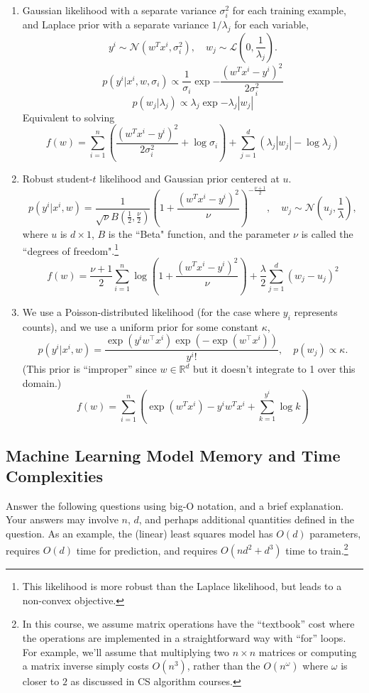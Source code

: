 \documentclass{article}
\def\blu#1{{\color{blu}#1}}
\def\R{\mathbb{R}}
\def\enum#1{\begin{enumerate}#1\end{enumerate}}
\begin{document}
\blu{\enum{
\item Gaussian likelihood with a separate variance $\sigma_i^2$ for each training example, and Laplace prior with a separate variance $1/\lambda_j$ for each variable,
\[
y^i \sim \mathcal{N}(w^Tx^i,\sigma_i^2), \quad w_j \sim \mathcal{L}\left(0,\frac{1}{\lambda_j}\right).
\]
\[p(y^i|x^i,w,\sigma_i) \propto \frac{1}{\sigma_i} \exp{-\frac{(w^T x^i - y^i)^2}{2\sigma_i^2}}\]
\[p(w_j|\lambda_j) \propto \lambda_j \exp{-\lambda_j |w_j|}\]
Equivalent to solving
\[f(w)=\sum_{i=1}^n \left(\frac{(w^T x^i - y^i)^2}{2\sigma_i^2} + \log{\sigma_i}\right)
+ \sum_{j=1}^d \left(\lambda_j |w_j| - \log{\lambda_j}\right)\]
\item Robust student-$t$ likelihood and Gaussian prior centered at $u$.
\[
p(y^i | x^i, w) = \frac{1}{\sqrt{\nu}B\left(\frac 1 2,\frac \nu 2\right)}\left(1 + \frac{(w^Tx^i - y^i)^2}{\nu}\right)^{-\frac{\nu + 1}{2}}, \quad w_j \sim \mathcal{N}\left(u_j,\frac{1}{\lambda}\right),
\]
where $u$ is $d \times 1$, $B$ is the ``Beta" function, and the parameter $\nu$ is called the ``degrees of freedom".\footnote{This likelihood is more robust than the Laplace likelihood, but leads to a non-convex objective.}
\[f(w)=\frac{\nu+1}{2}\sum_{i=1}^n\log{\left(1+\frac{(w^T x^i - y^i)^2}{\nu}\right)} 
+ \frac{\lambda}{2}\sum_{j=1}^d (w_j-u_j)^2\]
\item We use a Poisson-distributed likelihood (for the case where $y_i$ represents counts), and we use a uniform prior for some constant $\kappa$,
\[
p(y^i | x^i, w) = \frac{\exp(y^iw^\top x^i)\exp(-\exp(w^\top x^i))}{y^i!}, \quad p(w_j) \propto \kappa.
\]
(This prior is 	``improper'' since $w\in\R^d$ but it doesn't integrate to 1 over this domain.)
\[f(w)=\sum_{i=1}^n \left(\exp{(w^T x^i)} - y^i w^T x^i + \sum_{k=1}^{y^i} \log k \right)\]
}
}


\pagebreak

\subsection{Machine Learning Model Memory and Time Complexities}


Answer the following questions using big-O notation, and a brief explanation.
Your answers may involve $n$, $d$, and perhaps additional quantities defined in the question. 
As an example, the (linear) least squares model has $O(d)$ parameters, requires $O(d)$ time for prediction, and requires $O(nd^2 + d^3)$ time to train.\footnote{In this course, we assume matrix operations have the ``textbook'' cost where the operations are implemented in a straightforward way with ``for'' loops. For example, we'll assume that multiplying two $n \times n$ matrices or computing a matrix inverse simply costs $O(n^3)$, rather than the $O(n^\omega)$ where $\omega$ is closer to $2$ as discussed in CS algorithm courses.}
\end{document}

